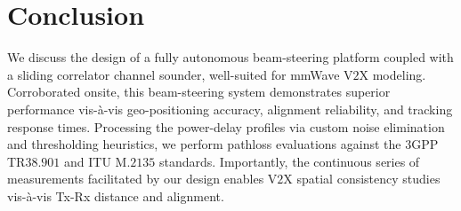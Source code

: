 \documentclass[10pt, twocolumn]{IEEEtran}
\begin{document}
\balance
\section{Conclusion}\label{S5}
We discuss the design of a fully autonomous beam-steering platform coupled with a sliding correlator channel sounder, well-suited for mmWave V$2$X modeling. Corroborated onsite, this beam-steering system demonstrates superior performance vis-\`{a}-vis geo-positioning accuracy, alignment reliability, and tracking response times. Processing the power-delay profiles via custom noise elimination and thresholding heuristics, we perform pathloss evaluations against the $3$GPP TR$38.901$ and ITU M$.2135$ standards. Importantly, the continuous series of measurements facilitated by our design enables V$2$X spatial consistency studies vis-\`{a}-vis Tx-Rx distance and alignment.\\

\balance

 
\end{document}
